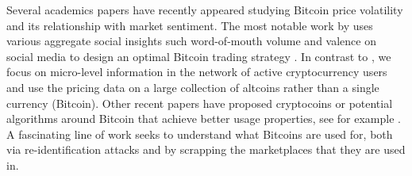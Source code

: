 Several academics papers have recently appeared studying Bitcoin price volatility and its relationship with market sentiment. The most notable work by \cite{Garcia-bitcoin} uses various aggregate social insights such word-of-mouth volume and valence on social media to design an optimal Bitcoin trading strategy . In contrast to \cite{Garcia-bitcoin}, we focus on micro-level information in the network of active cryptocurrency users and use the pricing data on a large collection of altcoins rather than a single currency (Bitcoin). Other recent papers have proposed cryptocoins or potential algorithms around Bitcoin that achieve better usage properties, see for example \cite{bonneau2014mixcoin}.
A fascinating line of work \cite{meiklejohn2013fistful,soska2015measuring} seeks to understand what Bitcoins are used for, both via re-identification attacks and by scrapping the marketplaces that they are used in.

